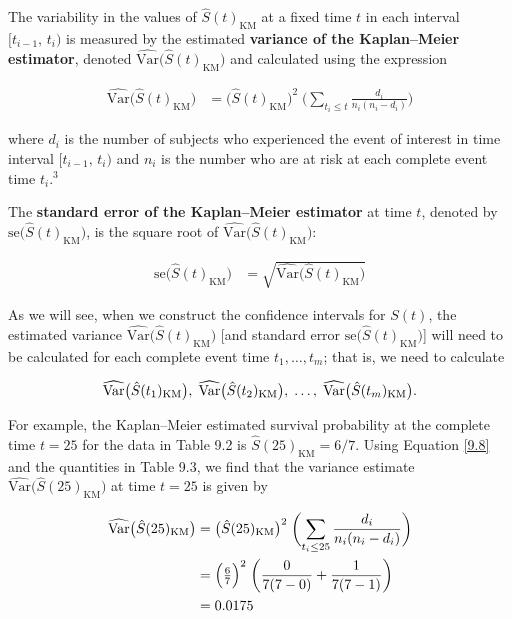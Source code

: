 \documentclass[
]{report}
\begin{document}
The variability in the values of \(\hat S(t)_{\mathrm{KM}}\) at a fixed time \(t\) in each interval \([t_{i-1},\,t_i)\) is measured by the estimated \textbf{variance of the Kaplan--Meier estimator}, denoted \(\widehat{\mathrm{Var}}\bigl(\hat S(t)_{\mathrm{KM}}\bigr)\) and calculated using the expression

\begin{align}\label{9.8}
\widehat{\mathrm{Var}}\bigl(\hat S(t)_{\mathrm{KM}}\bigr)
&= \bigl(\hat S(t)_{\mathrm{KM}}\bigr)^2 \;\biggl(\sum_{t_i \le t}\frac{d_i}{n_i(n_i - d_i)}\biggr)
\tag{9.8}
\end{align}

where \(d_i\) is the number of subjects who experienced the event of interest in time interval \([t_{i-1},\,t_i)\) and \(n_i\) is the number who are at risk at each complete event time \(t_i\).\(^3\)

The \textbf{standard error of the Kaplan--Meier estimator} at time \(t\), denoted by \(\mathrm{se}\bigl(\hat S(t)_{\mathrm{KM}}\bigr)\), is the square root of \(\widehat{\mathrm{Var}}\bigl(\hat S(t)_{\mathrm{KM}}\bigr)\):

\begin{align}\label{9.9}
\mathrm{se}\bigl(\hat S(t)_{\mathrm{KM}}\bigr)
&= \sqrt{\widehat{\mathrm{Var}}\bigl(\hat S(t)_{\mathrm{KM}}\bigr)}
\tag{9.9}
\end{align}

As we will see, when we construct the confidence intervals for \(S(t)\), the estimated variance \(\widehat{\mathrm{Var}}\bigl(\hat S(t)_{\mathrm{KM}}\bigr)\) {[}and standard error \(\mathrm{se}\bigl(\hat S(t)_{\mathrm{KM}}\bigr)\){]} will need to be calculated for each complete event time \(t_1,\dots,t_m\); that is, we need to calculate

\begin{align}
\widehat{\mathrm{Var}}\bigl(\hat S(t_1)_{\mathrm{KM}}\bigr),\;\widehat{\mathrm{Var}}\bigl(\hat S(t_2)_{\mathrm{KM}}\bigr),\;\dots,\;\widehat{\mathrm{Var}}\bigl(\hat S(t_m)_{\mathrm{KM}}\bigr).\notag
\end{align}

For example, the Kaplan--Meier estimated survival probability at the complete time \(t=25\) for the data in Table 9.2 is \(\hat S(25)_{\mathrm{KM}} = 6/7\). Using Equation \ref{9.8} and the quantities in Table 9.3, we find that the variance estimate \(\widehat{\mathrm{Var}}\bigl(\hat S(25)_{\mathrm{KM}}\bigr)\) at time \(t=25\) is given by

\begin{align}
\widehat{\mathrm{Var}}\bigl(\hat S(25)_{\mathrm{KM}}\bigr)
&= \bigl(\hat S(25)_{\mathrm{KM}}\bigr)^2 \;\biggl(\sum_{t_i \le 25}\frac{d_i}{n_i(n_i - d_i)}\biggr) \\
&= \Bigl(\tfrac{6}{7}\Bigr)^2 \;\biggl(\frac{0}{7(7-0)} + \frac{1}{7(7-1)}\biggr) \\
&= 0.0175 
\notag
\end{align}
\end{document}
